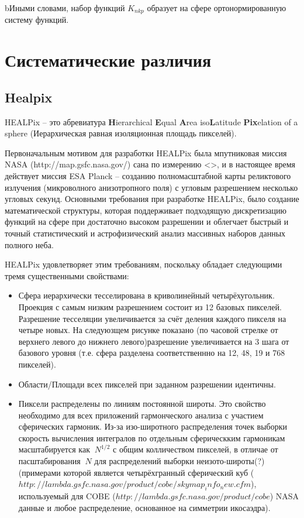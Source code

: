 \documentclass[14pt]{article} %
\begin{document}
bИными словами, набор функций $K_{nkp}$ образует на сфере ортонормированную систему функций.






\section{Систематические различия}\label{sistem}
		

\subsection{Healpix}\label{sub:smthhealpix}
HEALPix -- это абревиатура \textbf{H}ierarchical \textbf{E}qual \textbf{A}rea iso\textbf{L}atitude \textbf{Pix}elation of a sphere (Иерархическая равная изоляционная площадь пикселей). 

Первоначальным мотивом для разработки HEALPix была мпутниковая миссия NASA (http://map.gsfc.nasa.gov/) сана по измерению <>, и в настоящее время действует миссия ESA Planck -- созданию полномасштабной карты реликтового излучения (микроволного анизотропного поля) с угловым разрешением несколько угловых секунд. Основными требования при разработке HEALPix, было создание математической структуры, которая поддерживает подходящую дискретизацию функций на сфере при достаточно высоком разрешении и облегчает быстрый и точный статистический и астрофизический анализ массивных наборов данных полного неба.

HEALPix удовлетворяет этим требованиям, поскольку обладает следующими тремя существенными свойствами:

\begin{itemize}
\item Сфера иерархически тесселирована в криволинейный четырёхугольник. Проекция с самым низким разрешением состоит из 12 базовых пикселей. Разрешение тесселяции увеличивается за счёт деления каждого пикселя на четыре новых. На следуюзщем рисунке показано (по часовой стрелке от верхнего левого до нижнего левого)разрешение увеличивается на 3 шага от базового уровня (т.е. сфера разделена соответственнно на 12, 48, 19 и 768 пикселей).
\item Области/Площади всех пикселей при заданном разрешении идентичны.
\item Пиксели распределены по линиям постоянной широты. Это свойство необходимо для всех приложений гармонческого анализа с участием сферических гармоник. Из-за изо-широтного распределения точек выборки скорость вычисления интегралов по отдельным сферическким гармоникам масштабируется как $~N^{1/2}$ с общим колличеством пикселей, в отличае от пасштабирования $~N$ для распределений выборки неизото-широты(?) (примерами которой является четырёхгранный сферический куб ($http://lambda.gsfc.nasa.gov/product/cobe/skymap_info_new.cfm$), используемый для COBE ($http://lambda.gsfc.nasa.gov/product/cobe$) NASA данные и любое распределение, основанное на симметрии икосаэдра).
\end{itemize}
\end{document}
